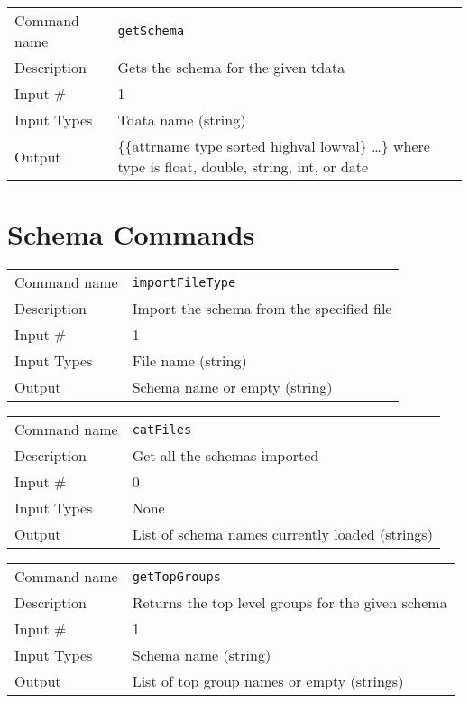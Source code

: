 \bigskip

\noindent
\begin{tabular}{l|p{5in}}
\hline
Command name & {\tt getSchema} \\
Description  & Gets the schema for the given tdata \\
Input \#     & 1 \\
Input Types  & Tdata name (string) \\
Output       & \{\{attrname type sorted highval lowval\} \ldots \}
               where type is float, double, string, int, or date \\
\hline
\end{tabular}

\section{Schema Commands}

\noindent
\begin{tabular}{l|p{5in}}
\hline
Command name & {\tt importFileType} \\
Description  & Import the schema from the specified file \\
Input \#     & 1 \\
Input Types  & File name (string) \\
Output       & Schema name or empty (string) \\
\hline
\end{tabular}

\bigskip

\noindent
\begin{tabular}{l|p{5in}}
\hline
Command name & {\tt catFiles} \\
Description  & Get all the schemas imported \\
Input \#     & 0 \\
Input Types  & None \\
Output       & List of schema names currently loaded (strings) \\
\hline
\end{tabular}

\bigskip

\noindent
\begin{tabular}{l|p{5in}}
\hline
Command name & {\tt getTopGroups} \\
Description  & Returns the top level groups for the given schema \\
Input \#     & 1 \\
Input Types  & Schema name (string) \\
Output       & List of top group names or empty (strings) \\
\hline
\end{tabular}

